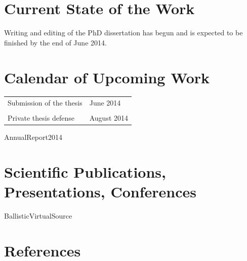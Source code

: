 \documentclass[11pt, a4paper]{article}
\begin{document}
\blindtext

\section{Current State of the Work}
Writing and editing of the PhD dissertation has begun and is expected to be finished by the end of
June 2014.

\section{Calendar of Upcoming Work}
\begin{tabular}{p{}  l}
  Submission of the thesis & June 2014\\\\
  Private thesis defense & August 2014
\end{tabular}%


\begin{btSect}[IEEEtranN]{AnnualReport2014}
\section{Scientific Publications, Presentations, Conferences}
\btPrintAll
\end{btSect}

\begin{btSect}[IEEEtran]{BallisticVirtualSource}
\section{References}
\btPrintAll
\end{btSect}
\end{document}
